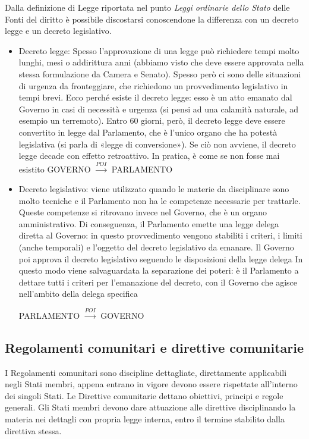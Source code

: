 Dalla definizione di Legge riportata nel punto \emph{Leggi ordinarie dello Stato} delle Fonti 
del diritto è possibile discostarsi conoscendone la differenza con un decreto legge e un decreto
legislativo.
\begin{itemize}
    \item Decreto legge: Spesso l’approvazione di una legge può richiedere tempi molto lunghi, mesi
     o addirittura anni (abbiamo visto che deve essere approvata nella stessa formulazione da Camera
      e Senato). Spesso però ci sono delle situazioni di urgenza da fronteggiare, che richiedono un 
      provvedimento legislativo in tempi brevi. Ecco perché esiste il decreto legge: esso è un atto
       emanato dal Governo in casi di necessità e urgenza (si pensi ad una calamità naturale, ad esempio 
       un terremoto). Entro 60 giorni, però, il decreto legge deve essere convertito in legge dal Parlamento, 
       che è l’unico organo che ha potestà legislativa (si parla di «legge di conversione»). Se ciò non 
       avviene, il decreto legge decade con effetto retroattivo. In pratica, è come se non fosse mai esistito
       \newline
       \centering GOVERNO $\xrightarrow{POI}$ PARLAMENTO
    \item Decreto legislativo: viene utilizzato quando le materie da disciplinare sono molto tecniche e il 
    Parlamento non ha le competenze necessarie per trattarle. Queste competenze si ritrovano invece nel Governo, 
    che è un organo amministrativo. \newline
    Di conseguenza, il Parlamento emette una legge delega diretta al Governo: in questo provvedimento vengono 
    stabiliti i criteri, i limiti (anche temporali) e l’oggetto del decreto legislativo da emanare. Il Governo poi 
    approva il decreto legislativo seguendo le disposizioni della legge delega
    In questo modo viene salvaguardata la separazione dei poteri: è il Parlamento a dettare tutti i criteri per l’emanazione
     del decreto, con il Governo che agisce nell’ambito della delega specifica

     PARLAMENTO $\xrightarrow{POI}$ GOVERNO
\end{itemize}

\subsection{Regolamenti comunitari e direttive comunitarie}
I Regolamenti comunitari sono discipline dettagliate, direttamente applicabili negli Stati membri, appena
entrano in vigore devono essere rispettate all'interno dei singoli Stati. \newline
Le Direttive comunitarie dettano obiettivi, principi e regole generali. Gli Stati membri devono dare attuazione
alle direttive disciplinando la materia nei dettagli con propria legge interna, entro il termine stabilito dalla
direttiva stessa.

